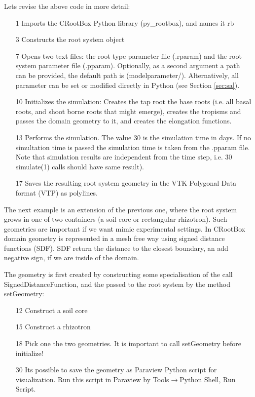 \documentclass[a4paper]{article}
\begin{document}
\noindent 
Lets revise the above code in more detail: 
\begin{itemize}
 \item[1] Imports the CRootBox Python library (py\_rootbox), and names it rb
 \item[3] Constructs the root system object
 \item[7] Opens two text files: the root type parameter file (.rparam) and the root system parameter file (.pparam). Optionally, as a second argument a path can be provided, the default path is (modelparameter/). 
 Alternatively, all parameter can be set or modified directly in Python (see Section \ref{sec:sa}).
 \item[10] Initializes the simulation: Creates the tap root the base roots (i.e. all basal roots, and shoot borne roots that might emerge), creates the tropisms and passes the domain geometry to it, and creates the elongation functions. 
 \item[13] Performs the simulation. The value 30 is the simulation time in days. If no simultation time is passed the simulation time is taken from the .pparam file. Note that simulation results are independent from the time step, 
 i.e. 30 simulate(1) calls should have same result). 
 \item[17] Saves the resulting root system geometry in the VTK Polygonal Data format (VTP) as polylines. 
\end{itemize}

The next example is an extension of the previous one, where the root system grows in one of two containers (a soil core or rectangular rhizotron).
Such geometries are important if we want mimic experimental settings. In CRootBox domain geometry is represented in a mesh free way using signed distance functions (SDF).
SDF return the distance to the closest boundary, an add negative sign, if we are inside of the domain.



The geometry is first created by constructing some specialisation of the call SignedDistanceFunction, and the passed to the root system by the method setGeometry: 
\begin{itemize}
 \item[12] Construct a soil core 
 \item[15] Construct a rhizotron
 \item[18] Pick one the two geometries. It is important to call setGeometry before initialize!
 \item[30] Its possible to save the geometry as Paraview Python script for visualization. Run this script in Paraview by Tools$\rightarrow$Python Shell, Run Script.
\end{itemize}
\end{document}
